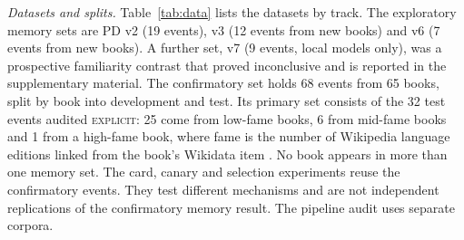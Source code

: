 \documentclass[sn-mathphys]{sn-jnl}%
\theoremstyle{thmstyleone}%
\theoremstyle{thmstyletwo}%
\theoremstyle{thmstylethree}%
\begin{document}
\emph{Datasets and splits.} Table~\ref{tab:data} lists the datasets by track. The exploratory memory sets are PD v2 (19 events), v3 (12 events from new books) and v6 (7 events from new books). A further set, v7 (9 events, local models only), was a prospective familiarity contrast that proved inconclusive and is reported in the supplementary material. The confirmatory set holds 68 events from 65 books, split by book into development and test. Its primary set consists of the 32 test events audited \textsc{explicit}: 25 come from low-fame books, 6 from mid-fame books and 1 from a high-fame book, where fame is the number of Wikipedia language editions linked from the book's Wikidata item \cite{vrandecic2014wikidata}. No book appears in more than one memory set. The card, canary and selection experiments reuse the confirmatory events. They test different mechanisms and are not independent replications of the confirmatory memory result. The pipeline audit uses separate corpora.
\end{document}
